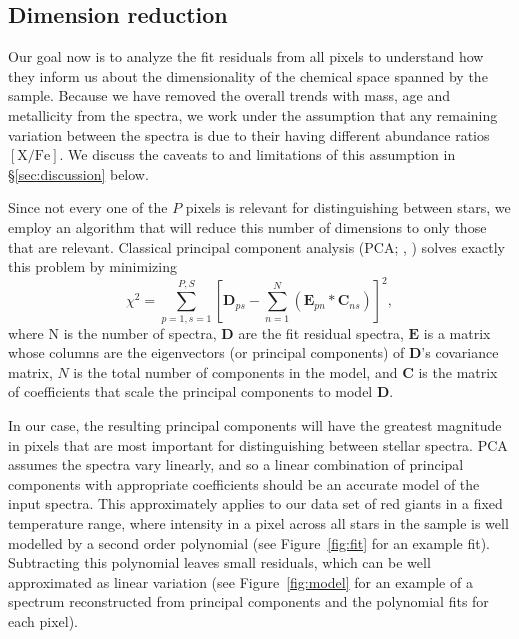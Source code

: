 \documentclass[a4paper,fleqn,usenatbib]{mnras}
\begin{document}
\subsection{Dimension reduction}
\label{sec:dimension}
Our goal now is to analyze the fit residuals from all pixels to understand how they inform us about the dimensionality of the chemical space spanned by the sample. Because we have removed the overall trends with mass, age and metallicity from the spectra, we work under the assumption that any remaining variation between the spectra is due to their having different abundance ratios $[\mathrm{X/Fe}]$. We discuss the caveats to and limitations of this assumption in \S\ref{sec:discussion} below.

Since not every one of the $P$ pixels is relevant for distinguishing between stars, we employ an algorithm that will reduce this number of dimensions to only those that are relevant. Classical principal component analysis (PCA; \citealt{Joliffe2002}, \citealt{Ivezic2014}) solves exactly this problem by minimizing
\begin{equation}
\chi^2 = \sum_{p=1,s=1}^{P,S}\left[\mathbf{D}_{ps} - \sum_{n=1}^{N}\left(\mathbf{E}_{pn}*\mathbf{C}_{ns}\right)\right]^2,
\end{equation}
where N is the number of spectra, $\mathbf{D}$ are the fit residual spectra, $\mathbf{E}$ is a matrix whose columns are the eigenvectors (or principal components) of $\mathbf{D}$'s covariance matrix, $N$ is the total number of components in the model, and $\mathbf{C}$ is the matrix of coefficients that scale the principal components to model $\mathbf{D}$.


In our case, the resulting principal components will have the greatest magnitude in pixels that are most important for distinguishing between stellar spectra. PCA assumes the spectra vary linearly, and so a linear combination of principal components with appropriate coefficients should be an accurate model of the input spectra. This approximately applies to our data set of red giants in a fixed temperature range, where intensity in a pixel across all stars in the sample is well modelled by a second order polynomial (see Figure~\ref{fig:fit} for an example fit). Subtracting this polynomial leaves small residuals, which can be well approximated as linear variation (see Figure~\ref{fig:model} for an example of a spectrum reconstructed from principal components and the polynomial fits for each pixel). 
\end{document}
